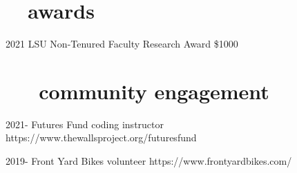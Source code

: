 \documentclass[]{CV}
\begin{document}
{%





\section{\faTrophy \ \ awards}
\begin{entrylist}

 \entry
 {2021}
 {LSU Non-Tenured Faculty Research Award}
 {\$1000}

\end{entrylist}











\section{ \faUserPlus \ \ \ community engagement}

\begin{entrylist}

 \entry
	 {2021-}
	 {Futures Fund coding instructor}
	 {https://www.thewallsproject.org/futuresfund}

 \entry
	 {2019-}
	 {Front Yard Bikes volunteer}
	 {https://www.frontyardbikes.com/}




\end{entrylist}















}
\end{document}
